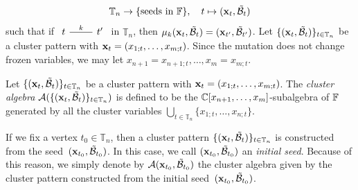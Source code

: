 \[
\mathbb{T}_n \to \{\text{seeds in } \mathbb{F}\}, \quad t \mapsto (\mathbf{x}_t, \mathcal{\tilde{B}}_t)
\]
such that if $\begin{tikzcd} t \arrow[r,dash, "k"] & t' \end{tikzcd}$ in $\mathbb{T}_n$, then $\mu_k(\mathbf{x}_t, \mathcal{\tilde{B}}_t) = (\mathbf{x}_{t'}, \mathcal{\tilde{B}}_{t'})$.
Let $\{ (\mathbf{x}_t, \mathcal{\tilde{B}}_t)\}_{t \in \mathbb{T}_n}$ be a cluster pattern with $\mathbf{x}_t = (x_{1;t},\dots,x_{m;t})$. Since the mutation does not change frozen variables, we may let $x_{n+1} = x_{n+1;t},\dots,x_m = x_{m;t}$.
\begin{definition}[{cf. \cite{FZ2_2003}}]
	Let $\{ (\mathbf{x}_t, \mathcal{\tilde{B}}_t)\}_{t \in \mathbb{T}_n}$ be a cluster pattern with $\mathbf{x}_t = (x_{1;t},\dots,x_{m;t})$.
	The \emph{cluster algebra} $\mathcal{A}(\{(\mathbf{x}_t, \mathcal{\tilde{B}}_t)\}_{t \in \mathbb{T}_n})$ is defined to be the $\mathbb{C}[x_{n+1},\dots,x_m]$-subalgebra 
	of $\mathbb{F}$ generated by all the cluster variables 
	 $\bigcup_{t \in \mathbb{T}_n} \{x_{1;t},\dots,x_{n;t}\}$.
\end{definition}
If we fix a vertex $t_0 \in \mathbb{T}_n$, then a cluster pattern $\{ (\mathbf{x}_{t}, \mathcal{\tilde{B}}_{t}) \}_{t \in \mathbb{T}_n}$ is 
constructed from the seed~$(\mathbf{x}_{t_0}, \mathcal{\tilde{B}}_{t_0})$. In this case, we call $(\mathbf{x}_{t_0}, \mathcal{\tilde{B}}_{t_0})$ an \emph{initial seed}. 
Because of this reason, we simply denote by $\mathcal{A}(\mathbf{x}_{t_0}, \mathcal{\tilde{B}}_{t_0})$ the cluster algebra given by the cluster 
pattern constructed from the initial seed~$(\mathbf{x}_{t_0}, \mathcal{\tilde{B}}_{t_0})$.
